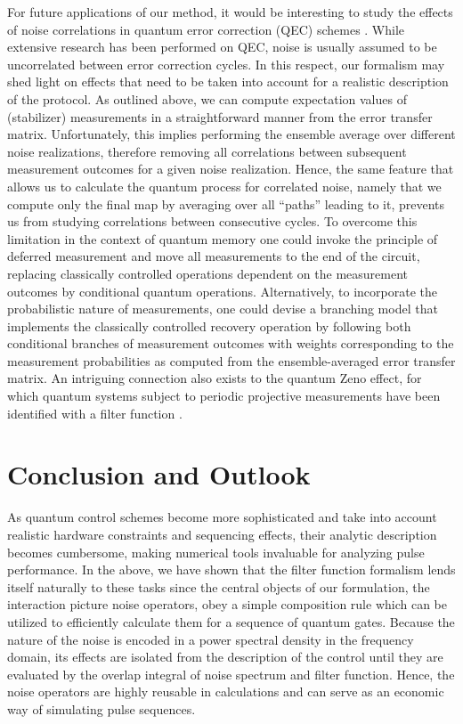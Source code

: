 For future applications of our method, it would be interesting to study the effects of noise correlations in quantum error correction (QEC) schemes \cite{Devitt2013,Ng2011,Nickerson2019}. While extensive research has been performed on QEC, noise is usually assumed to be uncorrelated between error correction cycles. In this respect, our formalism may shed light on effects that need to be taken into account for a realistic description of the protocol. As outlined above, we can compute expectation values of (stabilizer) measurements in a straightforward manner from the error transfer matrix. Unfortunately, this implies performing the ensemble average over different noise realizations, therefore removing all correlations between subsequent measurement outcomes for a given noise realization. Hence, the same feature that allows us to calculate the quantum process for correlated noise, namely that we compute only the final map by averaging over all \enquote{paths} leading to it, prevents us from studying correlations between consecutive cycles. To overcome this limitation in the context of quantum memory one could invoke the principle of deferred measurement \cite{NielsenChuang2011} and move all measurements to the end of the circuit, replacing classically controlled operations dependent on the measurement outcomes by conditional quantum operations. Alternatively, to incorporate the probabilistic nature of measurements, one could devise a branching model that implements the classically controlled recovery operation by following both conditional branches of measurement outcomes with weights corresponding to the measurement probabilities as computed from the ensemble-averaged error transfer matrix. An intriguing connection also exists to the quantum Zeno effect, for which quantum systems subject to periodic projective measurements have been identified with a filter function \cite{Kofman2000,Kofman2001,Chaudhry2016}.

\section{Conclusion and Outlook}\label{sec:conclusion}
As quantum control schemes become more sophisticated and take into account realistic hardware constraints and sequencing effects, their analytic description becomes cumbersome, making numerical tools invaluable for analyzing pulse performance. In the above, we have shown that the filter function formalism lends itself naturally to these tasks since the central objects of our formulation, the interaction picture noise operators, obey a simple composition rule which can be utilized to efficiently calculate them for a sequence of quantum gates. Because the nature of the noise is encoded in a power spectral density in the frequency domain, its effects are isolated from the description of the control until they are evaluated by the overlap integral of noise spectrum and filter function. Hence, the noise operators are highly reusable in calculations and can serve as an economic way of simulating pulse sequences.


